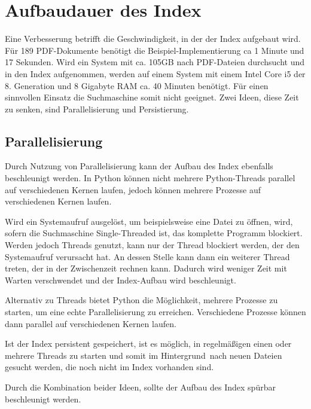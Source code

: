 \section{Aufbaudauer des Index}
Eine Verbesserung betrifft die Geschwindigkeit, in der der Index aufgebaut wird. Für 189 PDF-Dokumente benötigt die Beispiel-Implementierung ca 1 Minute und 17 Sekunden.
Wird ein System mit ca. 105GB nach PDF-Dateien durchsucht und in den Index aufgenommen, werden auf einem System mit einem Intel Core i5 der 8. Generation und 8 Gigabyte RAM ca. 40 Minuten benötigt. Für einen sinnvollen Einsatz die Suchmaschine somit nicht geeignet. Zwei Ideen, diese Zeit zu senken, sind Parallelisierung und Persistierung.

\subsection{Parallelisierung}
Durch Nutzung von Parallelisierung kann der Aufbau des Index ebenfalls beschleunigt werden. In Python können nicht mehrere Python-Threads  parallel auf verschiedenen Kernen laufen, jedoch können mehrere Prozesse auf verschiedenen Kernen laufen.\cite{multiprocess}

Wird ein Systemaufruf ausgelöst, um beispielsweise eine Datei zu öffnen, wird, sofern die Suchmaschine Single-Threaded ist, das komplette Programm blockiert. Werden jedoch Threads genutzt, kann nur der Thread blockiert werden, der den Systemaufruf verursacht hat. An dessen Stelle kann dann ein weiterer Thread treten, der in der Zwischenzeit rechnen kann. Dadurch wird weniger Zeit mit Warten verschwendet und der Index-Aufbau wird beschleunigt. 

Alternativ zu Threads bietet Python die Möglichkeit, mehrere Prozesse zu starten, um eine echte Parallelisierung zu erreichen. Verschiedene Prozesse können dann parallel auf verschiedenen Kernen laufen.

Ist der Index persistent gespeichert, ist es möglich, in regelmäßigen einen oder mehrere Threads zu starten und somit \glqq im Hintergrund\grqq\ nach neuen Dateien gesucht werden, die noch nicht im Index vorhanden sind. 

Durch die Kombination beider Ideen, sollte der Aufbau des Index spürbar beschleunigt werden.

